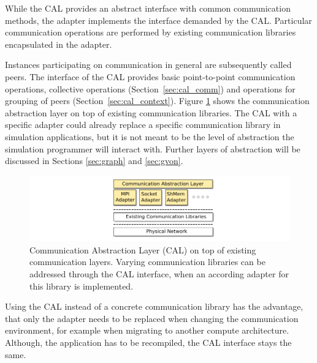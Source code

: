 While the CAL provides an abstract interface with common communication
methods, the adapter implements the interface demanded by the CAL.
Particular communication operations are performed by existing
communication libraries encapsulated in the adapter.

Instances participating on communication in general are subsequently
called peers.
The interface of the CAL provides basic point-to-point
communication operations, collective operations
(Section~\ref{sec:cal_comm}) and operations for grouping of peers
(Section~\ref{sec:cal_context}).  Figure \ref{fig:cal} shows
the communication abstraction layer on top of existing communication
libraries.  The CAL with a specific adapter could already replace a
specific communication library in simulation applications, but it
is not meant to be the level of abstraction the simulation programmer
will interact with. Further layers of abstraction will be discussed in
Sections \ref{sec:graph} and \ref{sec:gvon}.

\begin{figure}[H]
  \centering
  \includegraphics[width=\textwidth]{graphics/30_design_cal}
  \caption{Communication Abstraction Layer (CAL) on top of existing
    communication layers. Varying communication libraries can be
    addressed through the CAL interface, when an according adapter for
    this library is implemented.}
  \label{fig:cal}
\end{figure}


Using the CAL instead of a concrete communication library has
the advantage, that only the adapter needs to be replaced when
changing the communication environment, for example when migrating
to another compute architecture. Although, the application has
to be recompiled, the CAL interface stays the same.





